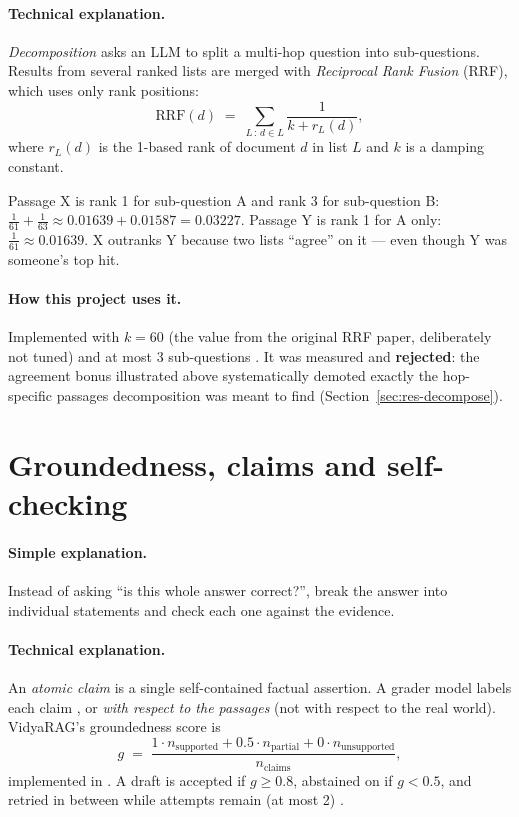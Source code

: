 \paragraph{Technical explanation.} \emph{Decomposition} asks an LLM to split a multi-hop question into sub-questions. Results from several ranked lists are merged with \emph{Reciprocal Rank Fusion} (RRF), which uses only rank positions:
\begin{equation}
\mathrm{RRF}(d) \;=\; \sum_{L \,:\, d \in L} \frac{1}{k + r_L(d)},
\end{equation}
where $r_L(d)$ is the 1-based rank of document $d$ in list $L$ and $k$ is a damping constant.

\begin{example}[RRF with $k=60$]
Passage X is rank 1 for sub-question A and rank 3 for sub-question B: $\tfrac{1}{61}+\tfrac{1}{63}\approx0.01639+0.01587=0.03227$. Passage Y is rank 1 for A only: $\tfrac{1}{61}\approx0.01639$. X outranks Y because two lists ``agree'' on it --- even though Y was someone's top hit.
\end{example}

\paragraph{How this project uses it.} Implemented with $k=60$ (the value from the original RRF paper, deliberately not tuned) and at most 3 sub-questions . It was measured and \textbf{rejected}: the agreement bonus illustrated above systematically demoted exactly the hop-specific passages decomposition was meant to find (Section~\ref{sec:res-decompose}).

\section{Groundedness, claims and self-checking}
\label{sec:groundedness}

\paragraph{Simple explanation.} Instead of asking ``is this whole answer correct?'', break the answer into individual statements and check each one against the evidence.

\paragraph{Technical explanation.} An \emph{atomic claim} is a single self-contained factual assertion. A grader model labels each claim ,  or  \emph{with respect to the passages} (not with respect to the real world). VidyaRAG's groundedness score is
\begin{equation}
g \;=\; \frac{1\cdot n_{\text{supported}} + 0.5\cdot n_{\text{partial}} + 0\cdot n_{\text{unsupported}}}{n_{\text{claims}}},
\end{equation}
implemented in . A draft is accepted if $g\ge0.8$, abstained on if $g<0.5$, and retried in between while attempts remain (at most 2) .

